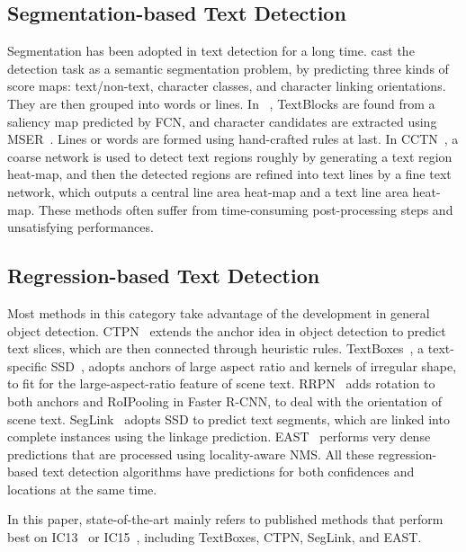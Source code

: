 \documentclass[letterpaper]{article} \usepackage{aaai18}  \usepackage{times}  \usepackage{helvet}  \usepackage{courier}  \usepackage{url}  \usepackage{graphicx}
\begin{document}
	\subsection{Segmentation-based Text Detection}
	Segmentation has been adopted in text detection for a long time. \cite{yao2016scene} cast the detection task as a semantic segmentation problem, by predicting three kinds of score maps: text/non-text, character classes, and character linking orientations. They are then grouped into words or lines. In ~\cite{zhang2016TextBlock}, TextBlocks are found from a saliency map predicted by FCN, and character candidates are extracted using MSER~\cite{Donoser2006MSER}. Lines or words are formed using hand-crafted rules at last. In CCTN~\cite{He2016CCTN}, a coarse network is used to detect text regions roughly by generating a text region heat-map, and then the detected regions are refined into text lines by a fine text network, which outputs a central line area heat-map and a text line area heat-map. These methods often suffer from time-consuming post-processing steps and unsatisfying performances.
	
	\subsection{Regression-based Text Detection}
	Most methods in this category take advantage of the development in general object detection. CTPN~\cite{Tian2016CTPN} extends the anchor idea in object detection to predict text slices, which are then connected through heuristic rules. TextBoxes~\cite{Liao2016TextBoxes}, a text-specific SSD~\cite{Liu2016SSD}, adopts anchors of large aspect ratio and kernels of irregular shape, to fit for the large-aspect-ratio feature of scene text.  RRPN~\cite{Ma2017Arbitrary} adds rotation to both anchors and RoIPooling in Faster R-CNN, to deal with the orientation of scene text. SegLink~\cite{Shi2017SegLink} adopts SSD to predict text segments, which are linked into complete instances using the linkage prediction.  EAST~\cite{Zhou2017EAST} performs very dense predictions that are processed using locality-aware NMS. All these regression-based text detection algorithms have predictions for both confidences and locations at the same time.
	
	In this paper, state-of-the-art mainly refers to published methods that perform best on IC13~\cite{Karatzas2013ICDAR} or IC15~\cite{Karatzas2015ICDAR}, including TextBoxes, CTPN, SegLink, and EAST.
	
\end{document}
